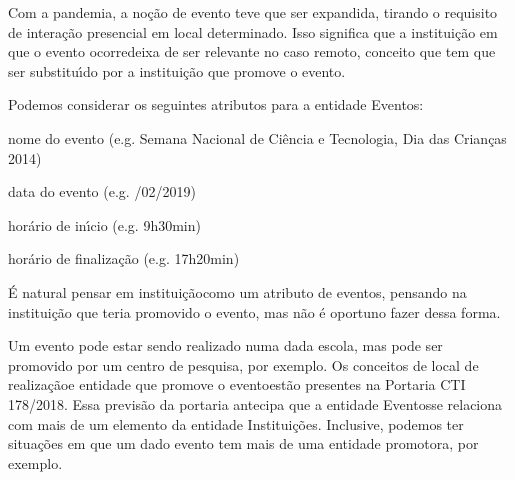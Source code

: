 \documentclass[
12pt,		%
openright,	%
twoside,  %
a4paper,			%
chapter=TITLE,		%
english,			%
french,				%
spanish,			%
brazil				%
]{USPSC-classe/USPSC}
\begin{document}
Com a pandemia, a no\c{c}\~ao de evento teve que ser expandida, tirando o requisito de intera\c{c}\~ao presencial em local determinado. Isso significa que \textquotedbl a institui\c{c}\~ao em que o evento ocorre\textquotedbl  deixa de ser relevante no caso remoto, conceito que tem que ser substitu\'{\i}do por \textquotedbl a institui\c{c}\~ao que promove o evento\textquotedbl .














Podemos considerar os seguintes atributos para a entidade \textquotedbl Eventos\textquotedbl :















\begin{alineas}
\item nome do evento (e.g. \textquotedbl Semana Nacional de Ci\^encia e Tecnologia\textquotedbl , \textquotedbl Dia das Crian\c{c}as 2014\textquotedbl )
\item data do evento (e.g. /02/2019\textquotedbl )
\item hor\'ario de in\'{\i}cio (e.g. \textquotedbl 9h30min\textquotedbl )
\item hor\'ario de finaliza\c{c}\~ao (e.g. \textquotedbl 17h20min\textquotedbl )
\end{alineas}

\'E natural pensar em \textquotedbl institui\c{c}\~ao\textquotedbl  como um atributo de eventos, pensando na institui\c{c}\~ao que teria promovido o evento, mas n\~ao \'e oportuno fazer dessa forma.














Um evento pode estar sendo realizado numa dada escola, mas pode ser promovido por um centro de pesquisa, por exemplo. Os conceitos de \textquotedbl local de realiza\c{c}\~ao\textquotedbl  e \textquotedbl entidade que promove o evento\textquotedbl  est\~ao presentes na Portaria CTI 178/2018. Essa previs\~ao da portaria antecipa que a entidade \textquotedbl Eventos\textquotedbl  se relaciona com mais de um elemento da entidade \textquotedbl Institui\c{c}\~oes\textquotedbl . Inclusive, podemos ter situa\c{c}\~oes em que um dado evento tem mais de uma entidade promotora, por exemplo.
\end{document}
